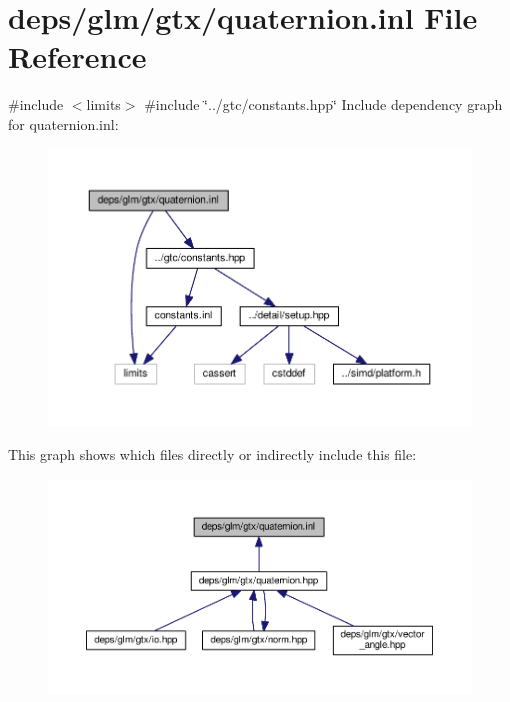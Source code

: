 \hypertarget{gtx_2quaternion_8inl}{}\section{deps/glm/gtx/quaternion.inl File Reference}
\label{gtx_2quaternion_8inl}
{\ttfamily \#include $<$limits$>$}\newline
{\ttfamily \#include \char`\"{}../gtc/constants.\+hpp\char`\"{}}\newline
Include dependency graph for quaternion.\+inl\+:
\nopagebreak
\begin{figure}[H]
\begin{center}
\leavevmode
\includegraphics[width=350pt]{dd/d1c/gtx_2quaternion_8inl__incl}
\end{center}
\end{figure}
This graph shows which files directly or indirectly include this file\+:
\nopagebreak
\begin{figure}[H]
\begin{center}
\leavevmode
\includegraphics[width=350pt]{d7/d32/gtx_2quaternion_8inl__dep__incl}
\end{center}
\end{figure}
